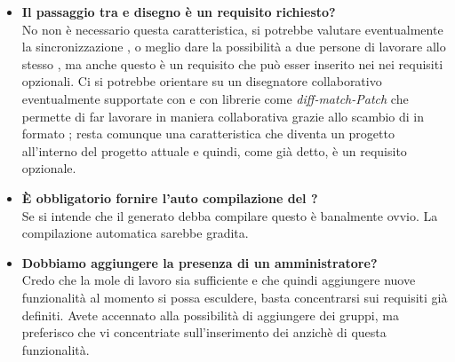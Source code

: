 \begin{itemize}
\\
	  		   	\item 
	   		\textbf{Il passaggio tra  e disegno è un requisito richiesto?} \\
	    	\justifying     		
No non è necessario questa caratteristica, si potrebbe valutare eventualmente la sincronizzazione , o meglio dare la possibilità a due persone di lavorare allo stesso  , ma anche questo è  un requisito che può esser inserito nei nei requisiti opzionali. Ci si potrebbe orientare su un disegnatore collaborativo eventualmente supportate con  e con librerie come \emph{diff-match-Patch} che permette di far lavorare in maniera collaborativa grazie allo scambio di  in formato ; resta comunque una caratteristica che diventa un progetto all'interno del progetto attuale e quindi, come già detto, è un requisito opzionale.
\\

	  		   	\item 
	   		\textbf{È obbligatorio fornire l'auto compilazione del ?} \\
	    	\justifying     		
Se si intende che il  generato debba compilare questo è banalmente ovvio. La compilazione automatica sarebbe gradita.
\\
		  		   	\item 
	   		\textbf{Dobbiamo aggiungere la presenza di un  amministratore?} \\
	    	\justifying     		
Credo che la mole di lavoro sia sufficiente e che quindi aggiungere nuove funzionalità al momento si possa esculdere, basta concentrarsi sui requisiti già definiti. Avete accennato alla possibilità di aggiungere dei gruppi, ma preferisco che vi concentriate sull'inserimento dei  anzichè di questa funzionalità.
\\
	   	 \end{itemize}
